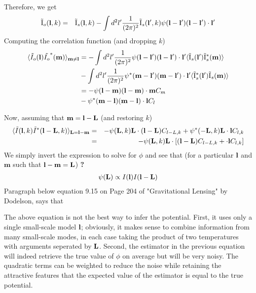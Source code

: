\documentclass[12pt]{article}
\newcommand{\beq}{\begin{equation}}
\newcommand{\eeq}{\end{equation}}
\newcommand{\beqa}{\begin{eqnarray}}
\newcommand{\eeqa}{\end{eqnarray}}
\newcommand{\beqal}{\begin{aligned}}
\newcommand{\eeqal}{\end{aligned}}
\def\l{{\bf l}}
\def\L{{\bf L}}
\def\il{{\tilde{\rm I}}}
\numberwithin{equation}{section}
\begin{document}
Therefore, we get
\begin{eqnarray}
\il_o(\l,k) &=& \il_s(\l, k) - \int {d^2l'} \frac{1}{(2\pi)^2}\il_s(\l',k)\psi(\l-\l')(\l-\l')\cdot
\l'
\end{eqnarray}
Computing the correlation function (and dropping $ k $)
\beq
\beqal
\langle \tilde I_o (\l) \tilde{I_o}^*(\textbf{m}) \rangle _{\textbf{m} \neq \textbf{l}} &= - \int {d^2 l'}  \frac{1}{(2\pi)^2}\psi(\l-\l')(\l-\l')\cdot \l'  \langle \il_s(\l^\prime) \il_s^*(\textbf{m})  \rangle 
\\
& -  \int {d^2 l'}  \frac{1}{(2\pi)^2}\psi^*(\textbf{m}-\l')(\textbf{m}-\l')\cdot \l'  \langle \il_s^*(\l^\prime) \il_s(\textbf{m}) \rangle
 \\
 &= -  \psi(\l-\textbf{m})(\l-\textbf{m})\cdot \textbf{m}  C_m 
 \\
&  -   \psi^*(\textbf{m}-\l)(\textbf{m}-\l)\cdot \l  C_l
\eeqal
\eeq

Now, assuming that $ \textbf{m} = \l- \L $ (and restoring $ k $)
\begin{eqnarray}
\langle \tilde I (\l,k) \tilde{I}^*(\l - \L, k) \rangle _{\textbf{L}  = \l - \textbf{m}} &=& -  \psi(\L, k)\L\cdot (\textbf{l} - \textbf{L})  C_{l - L, k} +   \psi^*(-\L, k)\L\cdot \l  C_{l, k} \\
&=& -  \psi(\L, k)\L \cdot \left[(\textbf{l} - \textbf{L})  C_{l - L, k} +  \cdot \l  C_{l, k}\right]
\end{eqnarray}
%
We simply invert the expression to solve for $ \phi $ and see that (for a particular $ \l $ and $ \textbf{m} $ such that $ \l  - \textbf{m} = \L$) \textbf{?}
\beqa
\psi(\L) \propto I(\l) I(\l - \L)
\eeqa
Paragraph below equation 9.15 on Page 204 of "Gravitational Lensing" by Dodelson, says that	

The above equation is not the best way to infer the potential. First, it uses only a single small-scale model $ \l $; obviously, it makes sense to combine information from many small-scale modes, in each case taking the product of two temperatures with arguments seperated by $ \L $. Second, the estimator in the previous equation will indeed retrieve the true value of $ \phi $ on average but will be very noisy. The quadratic terms can be weighted to reduce the noise while retaining the attractive features that the expected value of the estimator is equal to the true potential.
\end{document}
